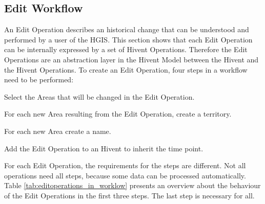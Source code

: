 

\subsection{Edit Workflow} %
\label{sub:edit_workflow}

An Edit Operation describes an historical change that can be understood and performed by a user of the HGIS. This section shows that each Edit Operation can be internally expressed by a set of Hivent Operations. Therefore the Edit Operations are an abstraction layer in the Hivent Model between the Hivent and the Hivent Operations. To create an Edit Operation, four steps in a workflow need to be performed:

\begin{compactenum}
  \item Select the Areas that will be changed in the Edit Operation.
  \item For each new Area resulting from the Edit Operation, create a territory.
  \item For each new Area create a name.
  \item Add the Edit Operation to an Hivent to inherit the time point.
\end{compactenum}

For each Edit Operation, the requirements for the steps are different. Not all operations need all steps, because some data can be processed automatically. Table \ref{tab:editoperations_in_worklow} presents an overview about the behaviour of the Edit Operations in the first three steps. The last step is necessary for all.

